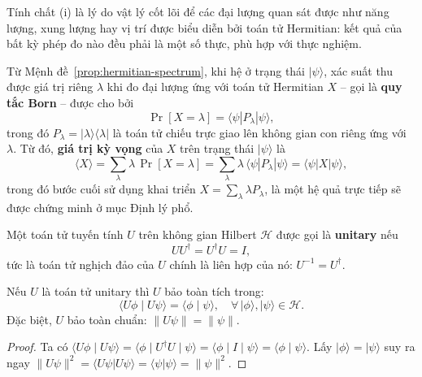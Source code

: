 \begin{remark}
\label{remark:bornRule}
Tính chất (i) là lý do vật lý cốt lõi để các đại lượng quan sát được như năng lượng,
xung lượng hay vị trí được biểu diễn bởi toán tử Hermitian: kết quả của bất kỳ phép
đo nào đều phải là một số thực, phù hợp với thực nghiệm.
\end{remark}


Từ Mệnh đề~\ref{prop:hermitian-spectrum}, khi hệ ở trạng thái $|\psi\rangle$,
xác suất thu được giá trị riêng $\lambda$ khi đo đại lượng ứng với toán tử Hermitian
$X$ -- gọi là \textbf{quy tắc Born} -- được cho bởi
\begin{equation}
    \Pr[X = \lambda] = \langle\psi| P_\lambda |\psi\rangle,
    \label{eq:born-rule}
\end{equation}
trong đó $P_\lambda = |\lambda\rangle\langle\lambda|$ là toán tử chiếu trực giao lên
không gian con riêng ứng với $\lambda$. Từ đó, \textbf{giá trị kỳ vọng} của $X$
trên trạng thái $|\psi\rangle$ là
\begin{equation}
    \langle X \rangle
    = \sum_\lambda \lambda\,\Pr[X = \lambda]
    = \sum_\lambda \lambda\,\langle\psi| P_\lambda |\psi\rangle
    = \langle\psi| X |\psi\rangle,
    \label{eq:expectation}
\end{equation}
trong đó bước cuối sử dụng khai triển $X = \sum_\lambda \lambda P_\lambda$,
là một hệ quả trực tiếp sẽ được chứng minh ở mục Định lý phổ.

\begin{definition}
Một toán tử tuyến tính $U$ trên không gian Hilbert $\mathcal{H}$ được gọi là
\textbf{unitary} nếu
$$U U^\dagger = U^\dagger U = I,$$
tức là toán tử nghịch đảo của $U$ chính là liên hợp của nó: $U^{-1} = U^\dagger$.
\end{definition}

\begin{proposition}
\label{prop:unitary-preserve}
Nếu $U$ là toán tử unitary thì $U$ bảo toàn tích trong:
$$\langle U\phi \mid U\psi \rangle = \langle \phi \mid \psi \rangle,
\quad \forall\, |\phi\rangle, |\psi\rangle \in \mathcal{H}.$$
Đặc biệt, $U$ bảo toàn chuẩn: $\|U\psi\| = \|\psi\|$.
\end{proposition}

\begin{proof}
Ta có $\langle U\phi \mid U\psi \rangle = \langle \phi \mid U^\dagger U \mid \psi \rangle
= \langle \phi \mid I \mid \psi \rangle = \langle \phi \mid \psi \rangle$.
Lấy $|\phi\rangle = |\psi\rangle$ suy ra ngay $\|U\psi\|^2 = \langle U\psi|U\psi\rangle
= \langle\psi|\psi\rangle = \|\psi\|^2$.
\end{proof}

